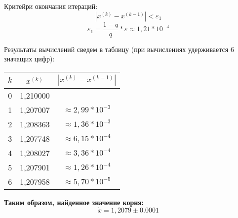 \documentclass[a4paper,12pt]{article} %
\begin{document}
\begin{enumerate}
Критейри окончания итераций:
$$|x^{(k)} - x^{(k - 1)}| < \varepsilon_1$$
$$\varepsilon_1 = \frac{1 - q}{q} * \varepsilon \approx 1,21 * 10^{-4}$$

Результаты вычислений сведем в таблицу (при вычислениях удерживается 6 значащих цифр):

\begin{center}
\begin{tabular}{ | c | c | c  | }
\hline
$k$ & $x^{(k)}$ & $|x^{(k)} - x^{(k - 1)}|$\\ \hline 
0 & 1,210000 & \\
1 & 1,207007 & $\approx 2,99 * 10^{-3}$ \\
2 & 1,208363 & $\approx 1,36 * 10^{-3}$ \\
3 & 1,207748 & $\approx 6,15 * 10^{-4}$ \\
4 & 1,208027 & $\approx 3,36 * 10^{-4}$ \\
5 & 1,207901 & $\approx 1,26 * 10^{-4}$ \\
6 & 1,207958 & $\approx 5,70 * 10^{-5}$ \\
\hline
\end{tabular}
\end{center}
\vspace{0.5cm}

\end{enumerate}
\begin{center}
\Large \textbf{Таким образом, найденное значение корня:} $$\dot x = 1,2079 \pm 0.0001$$
\end{center}
\end{document}

